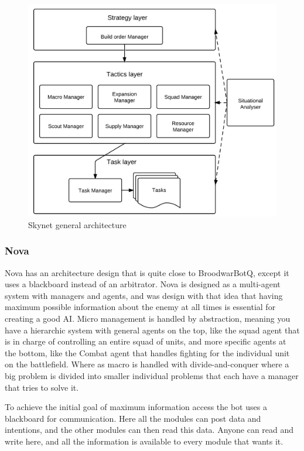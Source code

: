 
\begin{figure}[h!tbp]
\centering
\includegraphics[scale=0.8]{graphics/skynet.png}
\caption{Skynet general architecture}
\label{fig:skynetarch}
\end{figure}

\subsubsection{Nova}
Nova\cite{pérezmulti} has an architecture design that is quite close to
BroodwarBotQ, except it uses a blackboard instead of an arbitrator. Nova is
designed as a multi-agent system with managers and agents, and was design with
that idea that having maximum possible information about the enemy at all times
is essential for creating a good AI. Micro management is handled by abstraction,
meaning you have a hierarchic system with general agents on the top, like the
squad agent that is in charge of controlling an entire squad of units, and more
specific agents at the bottom, like the Combat agent that handles fighting for
the individual unit on the battlefield. Where as macro is handled with
divide-and-conquer where a big problem is divided into smaller individual
problems that each have a manager that tries to solve it. 

To achieve the initial goal of maximum information access the bot uses a
blackboard for communication. Here all the modules can post data and intentions,
and the other modules can then read this data. Anyone can read and write here,
and all the information is available to every module that wants it. 

